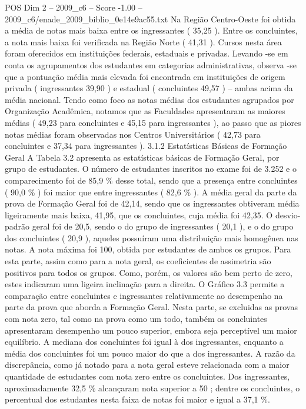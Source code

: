 \begin{textsample}{POS Dim 2 – 2009\_c6 – Score -1.00 – 2009\_c6/enade\_2009\_biblio\_0e14e9ac55.txt}
Na Região Centro-Oeste foi obtida a média de notas mais baixa entre os ingressantes ( 35,25 ).
Entre os concluintes, a nota mais baixa foi verificada na Região Norte ( 41,31 ).
Cursos nesta área foram oferecidos em instituições federais, estaduais e privadas.
Levando -se em conta os agrupamentos dos estudantes em categorias administrativas, observa -se que a pontuação média mais elevada foi encontrada em instituições de origem privada ( ingressantes 39,90 ) e estadual ( concluintes 49,57 ) – ambas acima da média nacional.
Tendo como foco as notas médias dos estudantes agrupados por Organização Acadêmica, notamos que as Faculdades apresentaram as maiores médias ( 49,23 para concluintes e 45,15 para ingressantes ), ao passo que as piores notas médias foram observadas nos Centros Universitários ( 42,73 para concluintes e 37,34 para ingressantes ). 3.1.2 Estatísticas Básicas de Formação Geral A Tabela 3.2 apresenta as estatísticas básicas de Formação Geral, por grupo de estudantes.
O número de estudantes inscritos no exame foi de 3.252 e o comparecimento foi de 85,9 \% desse total, sendo que a presença entre concluintes ( 90,0 \% ) foi maior que entre ingressantes ( 82,6 \% ).
A média geral da parte da prova de Formação Geral foi de 42,14, sendo que os ingressantes obtiveram média ligeiramente mais baixa, 41,95, que os concluintes, cuja média foi 42,35.
O desvio-padrão geral foi de 20,5, sendo o do grupo de ingressantes ( 20,1 ), e o do grupo dos concluintes ( 20,9 ), aqueles possuíram uma distribuição mais homogênea nas notas.
A nota máxima foi 100, obtida por estudantes de ambos os grupos.
Para esta parte, assim como para a nota geral, os coeficientes de assimetria são positivos para todos os grupos.
Como, porém, os valores são bem perto de zero, estes indicaram uma ligeira inclinação para a direita.
O Gráfico 3.3 permite a comparação entre concluintes e ingressantes relativamente ao desempenho na parte da prova que aborda a Formação Geral.
Nesta parte, se excluidas as provas com nota zero, tal como na prova como um todo, também os concluintes apresentaram desempenho um pouco superior, embora seja perceptível um maior equilíbrio.
A mediana dos concluintes foi igual à dos ingressantes, enquanto a média dos concluintes foi um pouco maior do que a dos ingressantes.
A razão da discrepância, como já notado para a nota geral esteve relacionada com a maior quantidade de estudantes com nota zero entre os concluintes.
Dos ingressantes, aproximadamente 32,5 \% alcançaram nota superior a 50 ; dentre os concluintes, o percentual dos estudantes nesta faixa de notas foi maior e igual a 37,1 \%.

\end{textsample}
